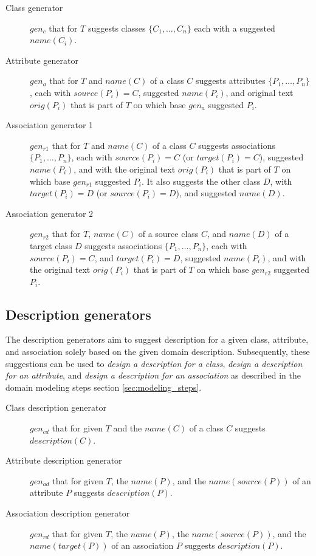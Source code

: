 \begin{description}
\item [Class generator] $gen_c$ that for $T$ suggests classes $\{C_1, \ldots, C_n\}$ each with a suggested $name(C_i)$.

\item [Attribute generator] $gen_a$ that for $T$ and $name(C)$ of a class $C$ suggests attributes $\{P_1, \ldots, P_n\}$, each with $source(P_i) = C$, suggested $name(P_i)$, and original text $orig(P_i)$ that is part of $T$ on which base $gen_a$ suggested $P_i$.

\item [Association generator 1] $gen_{r1}$ that for $T$ and $name(C)$ of a class $C$ suggests associations $\{P_1, \ldots, P_n\}$, each with $source(P_i) = C$ (or $target(P_i) = C$), suggested $name(P_i)$, and with the original text $orig(P_i)$ that is part of $T$ on which base $gen_{r1}$ suggested $P_i$. It also suggests the other class $D$, with $target(P_i)= D$ (or $source(P_i) = D$), and suggested $name(D)$.

\item [Association generator 2] $gen_{r2}$ that for $T$, $name(C)$ of a source class $C$, and $name(D)$ of a target class $D$ suggests associations $\{P_1, \ldots, P_n\}$, each with $source(P_i) = C$, and $target(P_i) = D$, suggested $name(P_i)$, and with the original text $orig(P_i)$ that is part of $T$ on which base $gen_{r2}$ suggested $P_i$.
\end{description}


\subsection{Description generators}

The description generators aim to suggest description for a given class, attribute, and association solely based on the given domain description. Subsequently, these suggestions can be used to \emph{design a description for a class}, \emph{design a description for an attribute}, and \emph{design a description for an association} as described in the domain modeling steps section \ref{sec:modeling_steps}.

\begin{description}
\item [Class description generator] $gen_{cd}$ that for given $T$ and the $name(C)$ of a class $C$ suggests $description(C)$.

\item [Attribute description generator] $gen_{ad}$ that for given $T$, the $name(P)$, and the $name(source(P))$ of an attribute $P$ suggests $description(P)$.

\item [Association description generator] $gen_{rd}$ that for given $T$, the $name(P)$, the $name(source(P))$, and the $name(target(P))$ of an association $P$ suggests $description(P)$.
\end{description}


